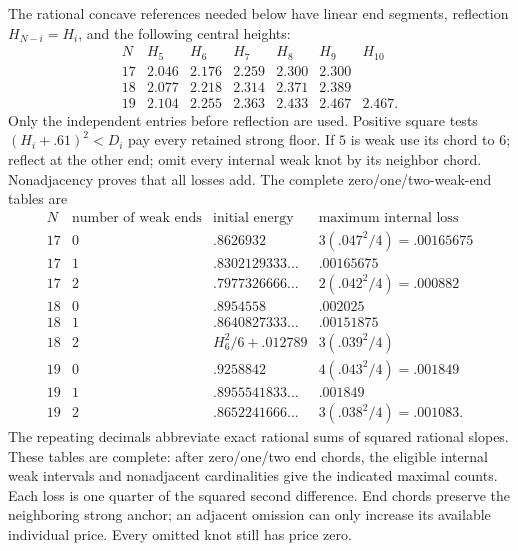 \documentclass[11pt]{article}
\theoremstyle{definition}
\theoremstyle{remark}
\begin{document}
The rational concave references needed below have
linear end segments, reflection \(H_{N-i}=H_i\),
and the following central heights:
\[
\begin{array}{c|rrrrrr}
N&H_5&H_6&H_7&H_8&H_9&H_{10}\\ \hline
17&2.046&2.176&2.259&2.300&2.300&\\
18&2.077&2.218&2.314&2.371&2.389&\\
19&2.104&2.255&2.363&2.433&2.467&2.467.
\end{array}
\]
Only the independent entries before reflection are used.
Positive square tests \((H_i+.61)^2<D_i\) pay every
retained strong floor. If \(5\) is weak use its chord
to \(6\); reflect at the other end; omit every
internal weak knot by its neighbor chord.
Nonadjacency proves that all losses add.
The complete zero/one/two-weak-end tables are
\[
\begin{array}{c|c|c|c}
N&\text{number of weak ends}&\text{initial energy}&
 \text{maximum internal loss}\\ \hline
17&0&.8626932&3(.047^2/4)=.00165675\\
17&1&.8302129333\ldots&.00165675\\
17&2&.7977326666\ldots&2(.042^2/4)=.000882\\
18&0&.8954558&.002025\\
18&1&.8640827333\ldots&.00151875\\
18&2&H_6^2/6+.012789&3(.039^2/4)\\
19&0&.9258842&4(.043^2/4)=.001849\\
19&1&.8955541833\ldots&.001849\\
19&2&.8652241666\ldots&3(.038^2/4)=.001083.
\end{array}
\]
The repeating decimals abbreviate exact rational
sums of squared rational slopes.
These tables are complete: after zero/one/two end
chords, the eligible internal weak intervals and
nonadjacent cardinalities give the indicated
maximal counts. Each loss is one quarter of the
squared second difference. End chords preserve
the neighboring strong anchor; an adjacent omission
can only increase its available individual price.
Every omitted knot still has price zero.
\end{document}
